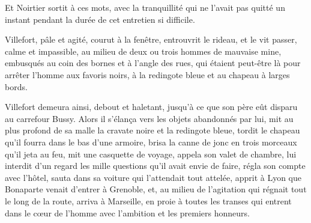 Et Noirtier sortit à ces mots, avec la tranquillité qui ne l'avait pas quitté un instant pendant la durée de cet entretien si difficile.

Villefort, pâle et agité, courut à la fenêtre, entrouvrit le rideau, et le vit passer, calme et impassible, au milieu de deux ou trois hommes de mauvaise mine, embusqués au coin des bornes et à l'angle des rues, qui étaient peut-être là pour arrêter l'homme aux favoris noirs, à la redingote bleue et au chapeau à larges bords.

Villefort demeura ainsi, debout et haletant, jusqu'à ce que son père eût disparu au carrefour Bussy. Alors il s'élança vers les objets abandonnés par lui, mit au plus profond de sa malle la cravate noire et la redingote bleue, tordit le chapeau qu'il fourra dans le bas d'une armoire, brisa la canne de jonc en trois morceaux qu'il jeta au feu, mit une casquette de voyage, appela son valet de chambre, lui interdit d'un regard les mille questions qu'il avait envie de faire, régla son compte avec l'hôtel, sauta dans sa voiture qui l'attendait tout attelée, apprit à Lyon que Bonaparte venait d'entrer à Grenoble, et, au milieu de l'agitation qui régnait tout le long de la route, arriva à Marseille, en proie à toutes les transes qui entrent dans le cœur de l'homme avec l'ambition et les premiers honneurs.




